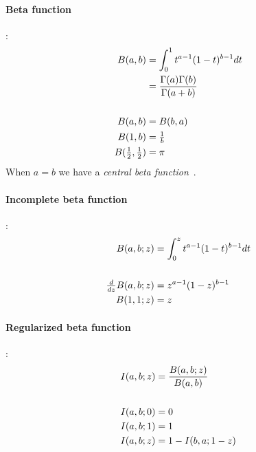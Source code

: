 \paragraph*{Beta function}\hspace{-0.8em}\cite{Abramowitz1965}:%
%
\begin{align*}
B(a,b) & 
= \int_0^1 t^{a-1}(1-t)^{b-1} dt						
\\ &= \frac{\Gamma(a)\Gamma(b)}{\Gamma(a+b)}		
\\
\\ B(a,b) & = B(b,a) 								
\\ B(1, b) &= \tfrac{1}{b}							
\\ B(\tfrac{1}{2}, \tfrac{1}{2}) &= \pi					
\end{align*}
When $a=b$ we have a {\em central beta function}~\cite{Borwein1992}.


\paragraph*{Incomplete beta function}\hspace{-0.8em}\cite{Abramowitz1965}:%
%
%
\begin{align*}
B(a,b;z) & = \int_0^z t^{a-1} (1-t)^{b-1} dt 							
\\
\\
\tfrac{d}{dz} B(a,b;z) & = z^{a-1} (1-z)^{b-1} 			 \\
B(1,1;z) & = z										
\end{align*}	




\paragraph*{Regularized beta function}\hspace{-0.8em}\cite{Abramowitz1965}:%
\label{RegBeta}
\begin{align*}
I(a,b;z) & = \frac{B(a,b;z)}{B(a,b)}				
\\
\\ I(a,b;0) & = 0 							
\\ I(a,b;1) & = 1 							
\\ I(a,b;z) & = 1 - I(b,a;1-z)					
\end{align*}





